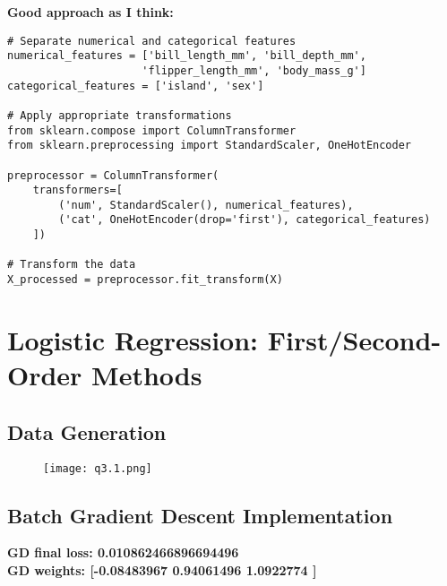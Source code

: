 \documentclass[12pt]{article}
\begin{document}
\textbf{Good approach as I think:}

\begin{lstlisting}[caption={Correct handling of mixed feature types}]
# Separate numerical and categorical features
numerical_features = ['bill_length_mm', 'bill_depth_mm', 
                     'flipper_length_mm', 'body_mass_g']
categorical_features = ['island', 'sex']

# Apply appropriate transformations
from sklearn.compose import ColumnTransformer
from sklearn.preprocessing import StandardScaler, OneHotEncoder

preprocessor = ColumnTransformer(
    transformers=[
        ('num', StandardScaler(), numerical_features),
        ('cat', OneHotEncoder(drop='first'), categorical_features)
    ])

# Transform the data
X_processed = preprocessor.fit_transform(X)
\end{lstlisting}

\section{Logistic Regression: First/Second-Order Methods}

\subsection{Data Generation}
\begin{figure}[h]
    \centering
    \texttt{[image: q3.1.png]}
\end{figure}
\subsection{Batch Gradient Descent Implementation}

\textbf{GD final loss: 0.010862466896694496\\
GD weights: [-0.08483967  0.94061496  1.0922774 ]}\\
\end{document}
